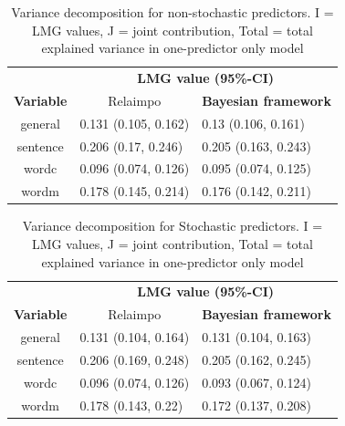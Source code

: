 \documentclass[11pt,a4paper,twoside]{book}
\begin{document}
\begin{table}[h]
\caption{Variance decomposition for non-stochastic predictors. I = LMG values, J = joint contribution, Total = total explained variance in one-predictor only model}
\centering
\begin{tabular}{cll}
   \toprule
   &\multicolumn{2}{c}{\textbf{LMG value (95\%-CI)}} \\
 \textbf{Variable} & \multicolumn{1}{c}{Relaimpo} & \textbf{Bayesian framework}  \\
  \hline
general & 0.131 (0.105, 0.162)  & 0.13 (0.106, 0.161)  \\ 
sentence & 0.206 (0.17, 0.246)  & 0.205 (0.163, 0.243)   \\ 
wordc & 0.096 (0.074, 0.126)  & 0.095 (0.074, 0.125)  \\ 
wordm & 0.178 (0.145, 0.214) & 0.176 (0.142, 0.211)  \\ 
   \bottomrule
\end{tabular}
\label{tbl:empirical.relaimp.comp}
\end{table}





\begin{table}[h]
\caption{Variance decomposition for Stochastic predictors. I = LMG values, J = joint contribution, Total = total explained variance in one-predictor only model}
\centering
\begin{tabular}{cll}
   \toprule
   &\multicolumn{2}{c}{\textbf{LMG value (95\%-CI)}} \\
 \textbf{Variable} & \multicolumn{1}{c}{Relaimpo} & \textbf{Bayesian framework}  \\
  \hline
general & 0.131 (0.104, 0.164)  &  0.131 (0.104, 0.163)  \\ 
sentence & 0.206 (0.169, 0.248)  &  0.205 (0.162, 0.245)   \\ 
wordc & 0.096 (0.074, 0.126)  &  0.093 (0.067, 0.124)  \\ 
wordm & 0.178 (0.143, 0.22) &  0.172 (0.137, 0.208) \\ 
   \bottomrule
\end{tabular}
\label{tbl:empirical.relaimp.comp.stoch}
\end{table}
 

\end{document}
